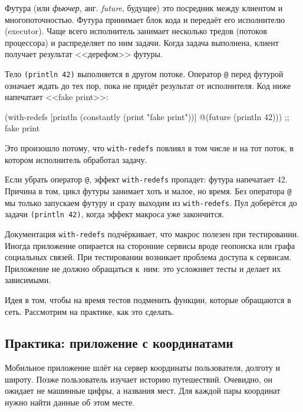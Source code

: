 
Футура (или \emph{фьючер}, анг. \emph{future}, будущее) это посредник между
клиентом и многопоточностью. Футура принимает блок кода и передаёт его
исполнителю (executor). Чаще всего исполнитель занимает несколько тредов
(потоков процессора) и распределяет по ним задачи. Когда задача выполнена,
клиент получает результат <<дерефом>> футуры.

Тело \verb|(println 42)| выполняется в другом потоке. Оператор \verb|@|
перед футурой означает ждать до тех пор, пока не придёт результат от
исполнителя. Код ниже напечатает <<fake print>>:


\begin{english}
  \begin{clojure}
(with-redefs
  [println (constantly (print "fake print"))]
  @(future (println 42)))
;; fake print
  \end{clojure}
\end{english}

Это произошло потому, что \verb|with-redefs| повлиял в том числе и на тот
поток, в котором исполнитель обработал задачу.

Если убрать оператор \verb|@|, эффект \verb|with-redefs| пропадет: футура
напечатает 42. Причина в том, цикл футуры занимает хоть и малое, но время. Без
оператора \verb|@| мы только запускаем футуру и сразу выходим из
\verb|with-redefs|. Пул доберётся до задачи \verb|(println 42)|, когда
эффект макроса уже закончится.

Документация \verb|with-redefs| подчёркивает, что макрос полезен при
тестировании. Иногда приложение опирается на сторонние сервисы вроде геопоиска
или графа социальных связей. При тестировании возникает проблема доступа к
сервисам. Приложение не должно обращаться к~ним: это усложняет тесты и делает их
зависимыми.

Идея в том, чтобы на время тестов подменить функции, которые обращаются в
сеть. Рассмотрим на практике, как это сделать.

\subsection{Практика: приложение с координатами}


Мобильное приложение шлёт на сервер координаты пользователя, долготу и
широту. Позже пользователь изучает историю путешествий. Очевидно, он ожидает не
машинные цифры, а названия мест. Для каждой пары координат нужно найти данные об
этом месте.

